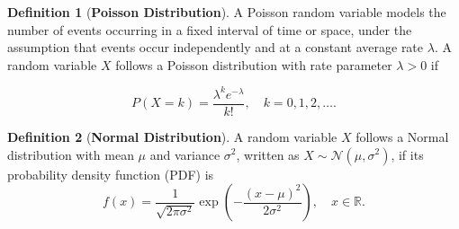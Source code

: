 \documentclass{article}
\theoremstyle{definition}
\newtheorem{definition}{Definition}[section]
\theoremstyle{remark}
\begin{document}
\begin{definition}[\textbf{Poisson Distribution}]
A Poisson random variable models the number of events occurring in a fixed interval of time or space, under the assumption that events occur independently and at a constant average rate \( \lambda \).
A random variable \( X \) follows a Poisson distribution with rate parameter \( \lambda > 0 \) if

\[
P(X = k) = \frac{\lambda^k e^{-\lambda}}{k!}, \quad k = 0, 1, 2, \dots.
\]


\end{definition}












\begin{definition}[\textbf{Normal Distribution}]
A random variable \( X \) follows a Normal distribution with mean \( \mu \) and variance \( \sigma^2 \), written as \( X \sim \mathcal{N}(\mu, \sigma^2) \), if its probability density function (PDF) is
\[
f(x) = \frac{1}{\sqrt{2\pi\sigma^2}} \exp \left( -\frac{(x - \mu)^2}{2\sigma^2} \right), \quad x \in \mathbb{R}.
\]
\end{definition}
\end{document}
